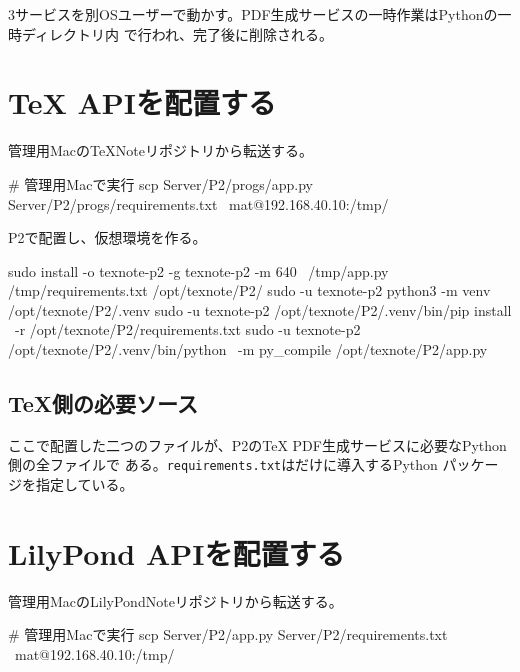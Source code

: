 \documentclass[uplatex,a4paper,11pt]{jsarticle}
\begin{document}
3サービスを別OSユーザーで動かす。PDF生成サービスの一時作業はPythonの一時ディレクトリ内
で行われ、完了後に削除される。

\section{TeX APIを配置する}

管理用MacのTeXNoteリポジトリから転送する。

\begin{command}
# 管理用Macで実行
scp Server/P2/progs/app.py Server/P2/progs/requirements.txt \
  mat@192.168.40.10:/tmp/
\end{command}

P2で配置し、仮想環境を作る。

\begin{command}
sudo install -o texnote-p2 -g texnote-p2 -m 640 \
  /tmp/app.py /tmp/requirements.txt /opt/texnote/P2/
sudo -u texnote-p2 python3 -m venv /opt/texnote/P2/.venv
sudo -u texnote-p2 /opt/texnote/P2/.venv/bin/pip install \
  -r /opt/texnote/P2/requirements.txt
sudo -u texnote-p2 /opt/texnote/P2/.venv/bin/python \
  -m py_compile /opt/texnote/P2/app.py
\end{command}

\subsection{TeX側の必要ソース}

ここで配置した二つのファイルが、P2のTeX PDF生成サービスに必要なPython側の全ファイルで
ある。\texttt{requirements.txt}はだけに導入するPython
パッケージを指定している。




\section{LilyPond APIを配置する}

管理用MacのLilyPondNoteリポジトリから転送する。

\begin{command}
# 管理用Macで実行
scp Server/P2/app.py Server/P2/requirements.txt \
  mat@192.168.40.10:/tmp/
\end{command}
\end{document}
